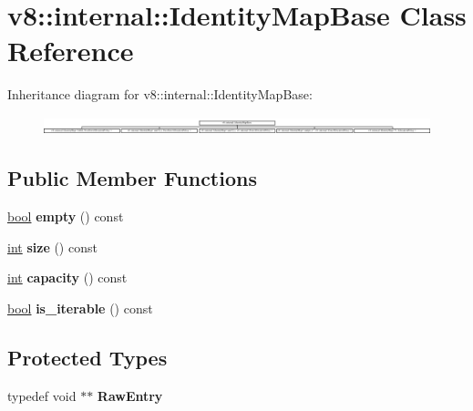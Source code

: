 \hypertarget{classv8_1_1internal_1_1IdentityMapBase}{}\section{v8\+:\+:internal\+:\+:Identity\+Map\+Base Class Reference}
\label{classv8_1_1internal_1_1IdentityMapBase}
Inheritance diagram for v8\+:\+:internal\+:\+:Identity\+Map\+Base\+:\begin{figure}[H]
\begin{center}
\leavevmode
\includegraphics[height=0.518519cm]{classv8_1_1internal_1_1IdentityMapBase}
\end{center}
\end{figure}
\subsection*{Public Member Functions}
\begin{DoxyCompactItemize}
\item 
\mbox{\label{classv8_1_1internal_1_1IdentityMapBase_a2eaa862537aa44c144c268d827d90643}} 
\mbox{\hyperlink{classbool}{bool}} {\bfseries empty} () const
\item 
\mbox{\label{classv8_1_1internal_1_1IdentityMapBase_a29059d0d4ccbfb656a1ef6b224c30fcd}} 
\mbox{\hyperlink{classint}{int}} {\bfseries size} () const
\item 
\mbox{\label{classv8_1_1internal_1_1IdentityMapBase_aed43eb3a4b7648e4156341c6e4778bdb}} 
\mbox{\hyperlink{classint}{int}} {\bfseries capacity} () const
\item 
\mbox{\label{classv8_1_1internal_1_1IdentityMapBase_aed6111a54dd7433492c059a001293dfa}} 
\mbox{\hyperlink{classbool}{bool}} {\bfseries is\+\_\+iterable} () const
\end{DoxyCompactItemize}
\subsection*{Protected Types}
\begin{DoxyCompactItemize}
\item 
\mbox{\label{classv8_1_1internal_1_1IdentityMapBase_a9b11c93a50924ab8628431ad57eeddbe}} 
typedef void $\ast$$\ast$ {\bfseries Raw\+Entry}
\end{DoxyCompactItemize}
